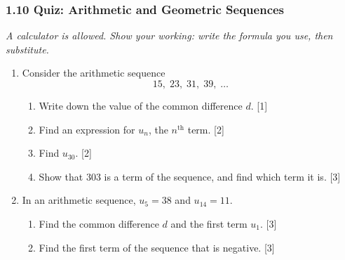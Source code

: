 \documentclass[12pt, twoside]{article}
\begin{document}
\subsubsection*{1.10 Quiz: Arithmetic and Geometric Sequences}

\emph{A calculator is allowed. Show your working: write the formula you
use, then substitute.}

\begin{enumerate}[itemsep=0.15cm]

\item[1.] [Maximum mark: 8]

Consider the arithmetic sequence
$$15,\; 23,\; 31,\; 39,\; \ldots$$

\begin{enumerate}[itemsep=0.1cm]
  \item Write down the value of the common difference $d$. \hfill [1]
  \item Find an expression for $u_{n}$, the $n^{\text{th}}$ term. \hfill [2]
  \item Find $u_{30}$. \hfill [2]
  \item Show that $303$ is a term of the sequence, and find which term
  it is. \hfill [3]
\end{enumerate}


\newpage

\item[2.] [Maximum mark: 9]

In an arithmetic sequence, $u_{5} = 38$ and $u_{14} = 11$.

\begin{enumerate}[itemsep=0.1cm]
  \item Find the common difference $d$ and the first term $u_{1}$.
  \hfill [3]
  \item Find the first term of the sequence that is negative. \hfill [3]
\end{enumerate}


\end{enumerate}
\end{document}
